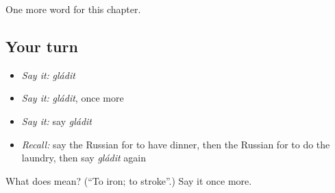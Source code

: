 \begin{grammarlens}[title={What you've built}]
One more word for this chapter.
\end{grammarlens}

\subsection*{Your turn}
\begin{itemize}
\raggedright
  \item \emph{Say it:} \emph{gládit}
  \item \emph{Say it:} \emph{gládit}, once more
  \item \emph{Say it:} say \emph{gládit}
  \item \emph{Recall:} say the Russian for to have dinner, then the Russian for to do the laundry, then say \emph{gládit} again
\end{itemize}

\begin{tcolorbox}[breakable,colback=teal!4,colframe=teal!35!black,title={Before you move on}]
What does  mean? (\textquotedblleft{}To iron; to stroke\textquotedblright{}.) Say it once more.
\end{tcolorbox}
